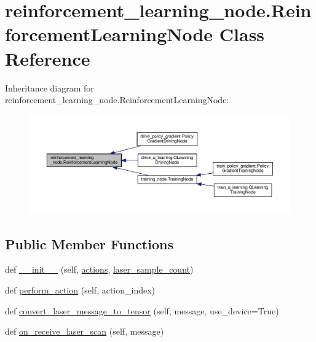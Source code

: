 \hypertarget{classreinforcement__learning__node_1_1_reinforcement_learning_node}{}\section{reinforcement\+\_\+learning\+\_\+node.\+Reinforcement\+Learning\+Node Class Reference}
\label{classreinforcement__learning__node_1_1_reinforcement_learning_node}


Inheritance diagram for reinforcement\+\_\+learning\+\_\+node.\+Reinforcement\+Learning\+Node\+:
\nopagebreak
\begin{figure}[H]
\begin{center}
\leavevmode
\includegraphics[width=350pt]{classreinforcement__learning__node_1_1_reinforcement_learning_node__inherit__graph}
\end{center}
\end{figure}
\subsection*{Public Member Functions}
\begin{DoxyCompactItemize}
\item 
def \hyperlink{classreinforcement__learning__node_1_1_reinforcement_learning_node_a7050f1b0b48c18cd34c19b72d2168882}{\+\_\+\+\_\+init\+\_\+\+\_\+} (self, \hyperlink{classreinforcement__learning__node_1_1_reinforcement_learning_node_acb5060eaf49b1cf5fae79ba36889eb02}{actions}, \hyperlink{classreinforcement__learning__node_1_1_reinforcement_learning_node_ad80aca8685a3a3301d4638b4899f7f0b}{laser\+\_\+sample\+\_\+count})
\item 
def \hyperlink{classreinforcement__learning__node_1_1_reinforcement_learning_node_aaf22bb92878d9348d7e48804c9ea3146}{perform\+\_\+action} (self, action\+\_\+index)
\item 
def \hyperlink{classreinforcement__learning__node_1_1_reinforcement_learning_node_a4600d1c7d1fee3f67f81d8e406bbfadb}{convert\+\_\+laser\+\_\+message\+\_\+to\+\_\+tensor} (self, message, use\+\_\+device=True)
\item 
def \hyperlink{classreinforcement__learning__node_1_1_reinforcement_learning_node_a407e78ab3f9542bf42ae8ad6b5169f66}{on\+\_\+receive\+\_\+laser\+\_\+scan} (self, message)
\end{DoxyCompactItemize}

